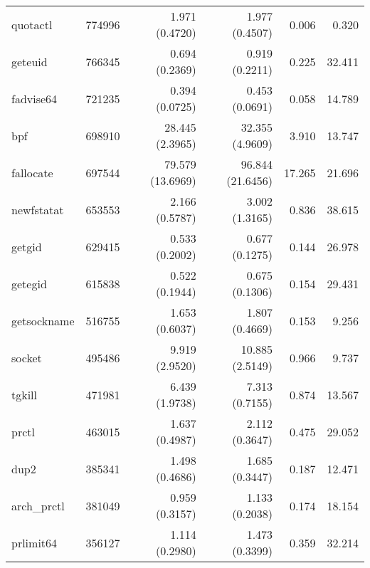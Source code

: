 \begin{longtable}{>{\ttfamily}lrrrrr}
                       quotactl &      774996 &           1.971 (0.4720) &           1.977 (0.4507) &           0.006 &        0.320 \\
                        geteuid &      766345 &           0.694 (0.2369) &           0.919 (0.2211) &           0.225 &       32.411 \\
                      fadvise64 &      721235 &           0.394 (0.0725) &           0.453 (0.0691) &           0.058 &       14.789 \\
                            bpf &      698910 &          28.445 (2.3965) &          32.355 (4.9609) &           3.910 &       13.747 \\
                      fallocate &      697544 &         79.579 (13.6969) &         96.844 (21.6456) &          17.265 &       21.696 \\
                     newfstatat &      653553 &           2.166 (0.5787) &           3.002 (1.3165) &           0.836 &       38.615 \\
                         getgid &      629415 &           0.533 (0.2002) &           0.677 (0.1275) &           0.144 &       26.978 \\
                        getegid &      615838 &           0.522 (0.1944) &           0.675 (0.1306) &           0.154 &       29.431 \\
                    getsockname &      516755 &           1.653 (0.6037) &           1.807 (0.4669) &           0.153 &        9.256 \\
                         socket &      495486 &           9.919 (2.9520) &          10.885 (2.5149) &           0.966 &        9.737 \\
                         tgkill &      471981 &           6.439 (1.9738) &           7.313 (0.7155) &           0.874 &       13.567 \\
                          prctl &      463015 &           1.637 (0.4987) &           2.112 (0.3647) &           0.475 &       29.052 \\
                           dup2 &      385341 &           1.498 (0.4686) &           1.685 (0.3447) &           0.187 &       12.471 \\
                    arch\_prctl &      381049 &           0.959 (0.3157) &           1.133 (0.2038) &           0.174 &       18.154 \\
                      prlimit64 &      356127 &           1.114 (0.2980) &           1.473 (0.3399) &           0.359 &       32.214 \\

\end{longtable}
